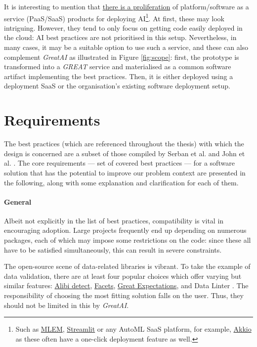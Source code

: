 It is interesting to mention that \href{https://xkcd.com/927/}{there is a proliferation} of platform/software as a service (PaaS/SaaS) products for deploying AI\footnote{Such as \href{https://mlem.ai/}{MLEM}, \href{https://streamlit.io/cloud}{Streamlit} or any AutoML SaaS platform, for example, \href{https://www.akkio.com/role/software-engineers}{Akkio} as these often have a one-click deployment feature as well.}. At first, these may look intriguing. However, they tend to only focus on getting code easily deployed in the cloud: AI best practices are not prioritised in this setup. Nevertheless, in many cases, it may be a suitable option to use such a service, and these can also complement \textit{GreatAI} as illustrated in Figure \ref{fig:scope}: first, the prototype is transformed into a \textit{GREAT} service and materialised as a common software artifact implementing the best practices. Then, it is either deployed using a deployment SaaS or the organisation's existing software deployment setup.

\section{Requirements} \label{section:requirements}

The best practices (which are referenced throughout the thesis) with which the design is concerned are a subset of those compiled by Serban et al. \cite{serban2020adoption,serban2021practices} and John et al. \cite{john2020architecting}. The core requirements --- set of covered best practices --- for a software solution that has the potential to improve our problem context are presented in the following, along with some explanation and clarification for each of them.

\paragraph{General} Albeit not explicitly in the list of best practices, compatibility is vital in encouraging adoption. Large projects frequently end up depending on numerous packages, each of which may impose some restrictions on the code: since these all have to be satisfied simultaneously, this can result in severe constraints. 

The open-source scene of data-related libraries is vibrant. To take the example of data validation, there are at least four popular choices which offer varying but similar features: \href{https://github.com/SeldonIO/alibi-detect}{Alibi detect}, \href{https://github.com/PAIR-code/facets}{Facets}, \href{https://github.com/great-expectations/great_expectations}{Great Expectations}, and Data Linter \cite{hynes2017data}. The responsibility of choosing the most fitting solution falls on the user. Thus, they should not be limited in this by \textit{GreatAI}. 

